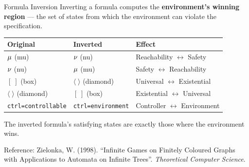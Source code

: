 \begin{frame}{Formula Inversion}
  Inverting a formula computes the \textbf{environment's winning region} --- the set of states from which the environment can violate the specification.

  \bigskip
  \begin{center}
  \begin{tabular}{lll}
    \toprule
    \textbf{Original} & \textbf{Inverted} & \textbf{Effect} \\
    \midrule
    $\mu$ (mu)  & $\nu$ (nu)  & Reachability $\leftrightarrow$ Safety \\
    $\nu$ (nu)  & $\mu$ (mu)  & Safety $\leftrightarrow$ Reachability \\
    $[\;]$ (box) & $\langle\;\rangle$ (diamond) & Universal $\leftrightarrow$ Existential \\
    $\langle\;\rangle$ (diamond) & $[\;]$ (box) & Existential $\leftrightarrow$ Universal \\
    \texttt{ctrl=controllable} & \texttt{ctrl=environment} & Controller $\leftrightarrow$ Environment \\
    \bottomrule
  \end{tabular}
  \end{center}

  \bigskip
  The inverted formula's satisfying states are exactly those where the \alert{environment wins}.

  \medskip
  {\scriptsize\color{ubaGray} Reference: Zielonka, W. (1998). ``Infinite Games on Finitely Coloured Graphs with Applications to Automata on Infinite Trees''. \emph{Theoretical Computer Science}.}
\end{frame}

